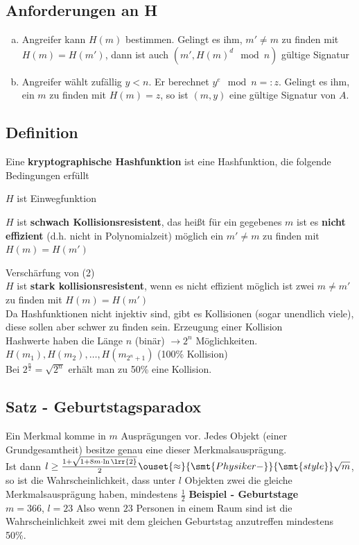   \subsection{Anforderungen an H}
    \begin{enumerate}[a)]
      \item Angreifer kann $H(m)$ bestimmen. Gelingt es ihm, $m'\neq m$ zu
        finden mit\\
        $H(m)=H(m')$, dann ist auch $(m', H(m)^d\mod n)$ gültige
        Signatur
      \item Angreifer wählt zufällig $y<n$. Er berechnet $y^e\mod n=:z$.
        Gelingt es ihm, ein $m$ zu finden mit $H(m)=z$, so ist $(m, y)$ eine
        gültige Signatur von $A$.
    \end{enumerate}

	\subsection{Definition}
	Eine \textbf{kryptographische Hashfunktion} ist eine Hashfunktion, die folgende Bedingungen erfüllt
		\item $H$ ist Einwegfunktion
		\item $H$ ist \textbf{schwach Kollisionsresistent}, das heißt für ein gegebenes $m$ ist es \textbf{nicht effizient} (d.h. nicht in Polynomialzeit) möglich ein $m'\neq m$ zu finden mit\\
		$H(m)=H(m')$
		\item[(2)'] Verschärfung von (2)\\
			$H$ ist \textbf{stark kollisionsresistent}, wenn es nicht effizient möglich ist zwei $m\neq m'$ zu finden mit $H(m)=H(m')$\\
			Da Hashfunktionen nicht injektiv sind, gibt es Kollisionen (sogar unendlich viele), diese sollen aber schwer zu finden sein.
	\subExEnd
	Erzeugung einer Kollision\\
	Hashwerte haben die Länge $n$ (binär) $\rightarrow 2^n$ Möglichkeiten.\\
	$H(m_1),H(m_2),\dots,H(m_{2^n+1})$ (100\% Kollision)\\
	Bei $2^{\frac{n}{2}}=\sqrt{2^n}$ erhält man zu 50\% eine Kollision.
	
	\subsection{Satz - Geburtstagsparadox}
		Ein Merkmal komme in $m$ Ausprägungen vor. Jedes Objekt (einer Grundgesamtheit) besitze genau eine dieser Merkmalsausprägung.\\
		Ist dann $l\geq\frac{1+\sqrt{1+8m\cdot\ln\lrr{2}}}{2}\ouset{\approx}{\smt{Physiker-}}{\smt{style}}\sqrt{m}$, so ist die Wahrscheinlichkeit, dass unter $l$ Objekten zwei die gleiche Merkmalsausprägung haben, mindestens $\frac{1}{2}$
\newpage
		\textbf{Beispiel - Geburtstage}\\
		$m=366$, $l=23$ Also wenn $23$ Personen in einem Raum sind ist die Wahrscheinlichkeit zwei mit dem gleichen Geburtstag anzutreffen mindestens 50\%.
	

